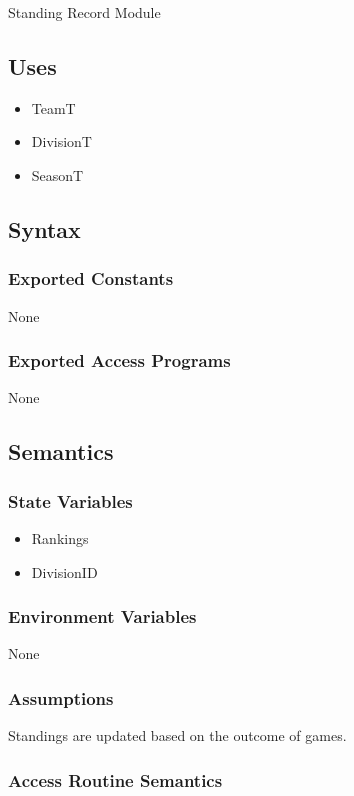 \documentclass[12pt, titlepage]{article}
\begin{document}
Standing Record Module

\subsection{Uses}
\begin{itemize}
  \item TeamT
  \item DivisionT
  \item SeasonT
\end{itemize}

\subsection{Syntax}

\subsubsection{Exported Constants} None

\subsubsection{Exported Access Programs} None

\subsection{Semantics}

\subsubsection{State Variables}
\begin{itemize}
  \item Rankings
  \item DivisionID
\end{itemize}

\subsubsection{Environment Variables}

None

\subsubsection{Assumptions}

Standings are updated based on the outcome of games.

\subsubsection{Access Routine Semantics}
\end{document}
